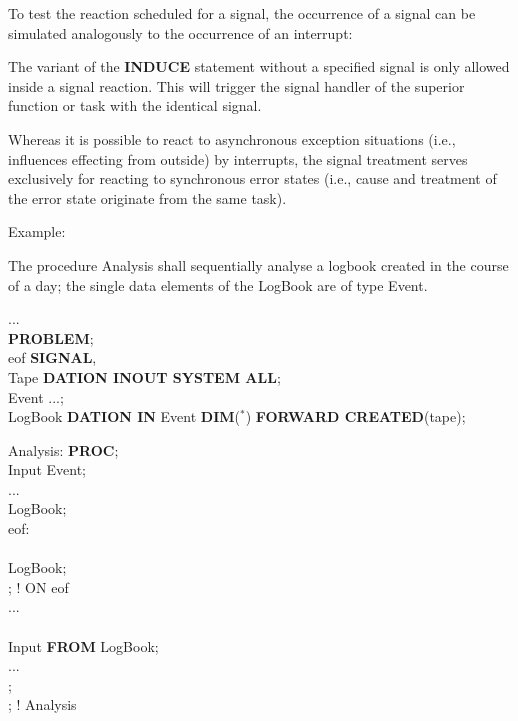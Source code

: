 To test the reaction scheduled for a signal, the occurrence of a signal
can be simulated analogously to the occurrence of an interrupt:




The variant of the {\bf INDUCE} statement without a specified signal is 
only allowed inside a signal reaction. This will trigger the signal handler
of the superior function or task with the identical signal.


Whereas it is possible to react to asynchronous exception situations
(i.e., influences effecting from outside) by interrupts, the signal
treatment serves exclusively for reacting to synchronous error states
(i.e., cause and treatment of the error state originate from the same
task).

Example:

The procedure Analysis shall sequentially analyse a logbook created
in the course of a day; the single data elements of the LogBook are of
type Event.

...\\
{\bf PROBLEM};\\
 eof {\bf SIGNAL},\\
\x \x Tape {\bf DATION INOUT SYSTEM ALL};\\
 Event ...;\\
 LogBook {\bf DATION IN} Event {\bf DIM}($^*$) {\bf FORWARD CREATED}(tape);

Analysis: {\bf PROC};\\
 Input Event;\\
\x ...\\
 LogBook;\\
 eof:\\
\x {}\\
\x \x {} LogBook;\\
\x {}; ! ON eof\\
\x ...\\
\\
\x {} Input {\bf FROM} LogBook;\\
\x \x ...\\
;\\
; ! Analysis

